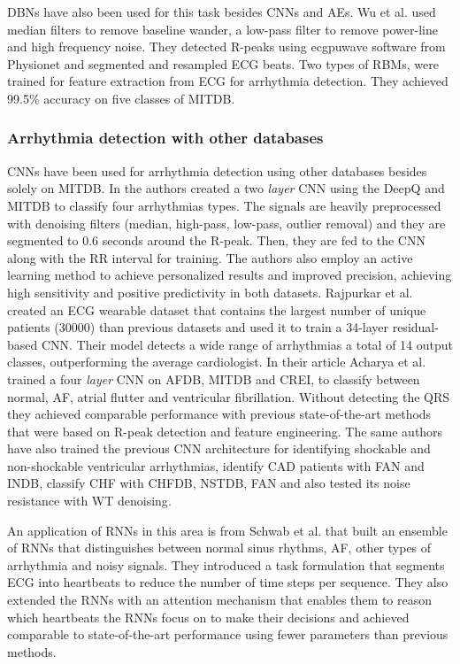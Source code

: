 \documentclass[journal]{IEEEtran}
\begin{document}
DBNs have also been used for this task besides CNNs and AEs.
Wu et al.\cite{wu2016novel} used median filters to remove baseline wander, a low-pass filter to remove power-line and high frequency noise.
They detected R-peaks using ecgpuwave software from Physionet and segmented and resampled ECG beats.
Two types of RBMs, were trained for feature extraction from ECG for arrhythmia detection.
They achieved 99.5\% accuracy on five classes of MITDB\@.

\subsubsection{Arrhythmia detection with other databases}
CNNs have been used for arrhythmia detection using other databases besides solely on MITDB\@.
In\cite{wu2018personalizing} the authors created a two \textit{layer} CNN using the DeepQ\cite{wu2017deepq} and MITDB to classify four arrhythmias types.
The signals are heavily preprocessed with denoising filters (median, high-pass, low-pass, outlier removal) and they are segmented to 0.6 seconds around the R-peak.
Then, they are fed to the CNN along with the RR interval for training.
The authors also employ an active learning method to achieve personalized results and improved precision, achieving high sensitivity and positive predictivity in both datasets.
Rajpurkar et al.\cite{rajpurkar2017cardiologist} created an ECG wearable dataset that contains the largest number of unique patients (30000) than previous datasets and used it to train a 34-layer residual-based CNN\@.
Their model detects a wide range of arrhythmias a total of 14 output classes, outperforming the average cardiologist.
In their article Acharya et al.\cite{acharya2017automateda} trained a four \textit{layer} CNN on AFDB, MITDB and CREI, to classify between normal, AF, atrial flutter and ventricular fibrillation.
Without detecting the QRS they achieved comparable performance with previous state-of-the-art methods that were based on R-peak detection and feature engineering.
The same authors have also trained the previous CNN architecture for identifying shockable and non-shockable ventricular arrhythmias\cite{acharya2018automated}, identify CAD patients with FAN and INDB\cite{acharya2017automatedb}, classify CHF with CHFDB, NSTDB, FAN\cite{acharya2018deep} and also tested its noise resistance with WT denoising\cite{acharya2017application}.

An application of RNNs in this area is from Schwab et al.\cite{schwab2017beat} that built an ensemble of RNNs that distinguishes between normal sinus rhythms, AF, other types of arrhythmia and noisy signals.
They introduced a task formulation that segments ECG into heartbeats to reduce the number of time steps per sequence.
They also extended the RNNs with an attention mechanism that enables them to reason which heartbeats the RNNs focus on to make their decisions and achieved comparable to state-of-the-art performance using fewer parameters than previous methods.
\end{document}

